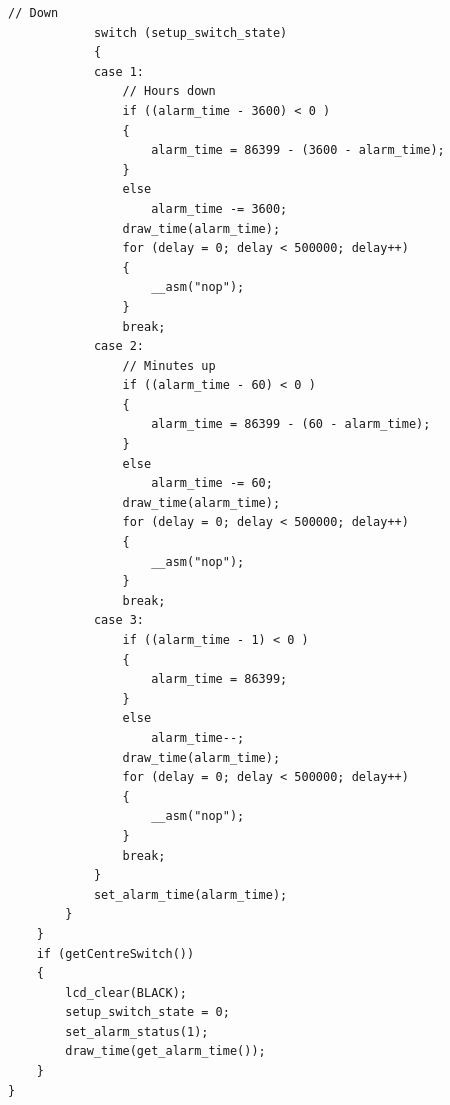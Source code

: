 \documentclass[a4paper]{article}
\begin{document}
\begin{landscape}
\begin{lstlisting}[frame=single]
			// Down
			switch (setup_switch_state)
			{
			case 1:
				// Hours down
				if ((alarm_time - 3600) < 0 )
				{
					alarm_time = 86399 - (3600 - alarm_time);
				}
				else 
					alarm_time -= 3600;
				draw_time(alarm_time);
				for (delay = 0; delay < 500000; delay++)
				{
					__asm("nop");
				}
				break;
			case 2:
				// Minutes up
				if ((alarm_time - 60) < 0 )
				{
					alarm_time = 86399 - (60 - alarm_time);
				}
				else
					alarm_time -= 60;
				draw_time(alarm_time);
				for (delay = 0; delay < 500000; delay++)
				{
					__asm("nop");
				}
				break;
			case 3:
				if ((alarm_time - 1) < 0 )
				{
					alarm_time = 86399;
				}
				else 
					alarm_time--;
				draw_time(alarm_time);
				for (delay = 0; delay < 500000; delay++)
				{
					__asm("nop");
				}
				break;
			}		
			set_alarm_time(alarm_time);
		}
	}
	if (getCentreSwitch())
	{
		lcd_clear(BLACK);
		setup_switch_state = 0;
		set_alarm_status(1);
		draw_time(get_alarm_time());
	}
}


\end{lstlisting}
\end{landscape}
\end{document}
